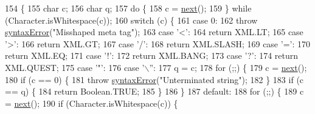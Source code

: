 \begin{DoxyCode}
154                                                   \{
155         \textcolor{keywordtype}{char} c;
156         \textcolor{keywordtype}{char} q;
157         \textcolor{keywordflow}{do} \{
158             c = \hyperlink{classorg_1_1json_1_1_j_s_o_n_tokener_ae129753dbe43ea50aa34e3c06773fdfb}{next}();
159         \} \textcolor{keywordflow}{while} (Character.isWhitespace(c));
160         \textcolor{keywordflow}{switch} (c) \{
161         \textcolor{keywordflow}{case} 0:
162             \textcolor{keywordflow}{throw} \hyperlink{classorg_1_1json_1_1_j_s_o_n_tokener_a467f559950c039f28394ce3a0d2659ca}{syntaxError}(\textcolor{stringliteral}{"Misshaped meta tag"});
163         \textcolor{keywordflow}{case} \textcolor{charliteral}{'<'}:
164             \textcolor{keywordflow}{return} XML.LT;
165         \textcolor{keywordflow}{case} \textcolor{charliteral}{'>'}:
166             \textcolor{keywordflow}{return} XML.GT;
167         \textcolor{keywordflow}{case} \textcolor{charliteral}{'/'}:
168             \textcolor{keywordflow}{return} XML.SLASH;
169         \textcolor{keywordflow}{case} \textcolor{charliteral}{'='}:
170             \textcolor{keywordflow}{return} XML.EQ;
171         \textcolor{keywordflow}{case} \textcolor{charliteral}{'!'}:
172             \textcolor{keywordflow}{return} XML.BANG;
173         \textcolor{keywordflow}{case} \textcolor{charliteral}{'?'}:
174             \textcolor{keywordflow}{return} XML.QUEST;
175         \textcolor{keywordflow}{case} \textcolor{charliteral}{'"'}:
176         \textcolor{keywordflow}{case} \textcolor{charliteral}{'\(\backslash\)''}:
177             q = c;
178             \textcolor{keywordflow}{for} (;;) \{
179                 c = \hyperlink{classorg_1_1json_1_1_j_s_o_n_tokener_ae129753dbe43ea50aa34e3c06773fdfb}{next}();
180                 \textcolor{keywordflow}{if} (c == 0) \{
181                     \textcolor{keywordflow}{throw} \hyperlink{classorg_1_1json_1_1_j_s_o_n_tokener_a467f559950c039f28394ce3a0d2659ca}{syntaxError}(\textcolor{stringliteral}{"Unterminated string"});
182                 \}
183                 \textcolor{keywordflow}{if} (c == q) \{
184                     \textcolor{keywordflow}{return} Boolean.TRUE;
185                 \}
186             \}
187         \textcolor{keywordflow}{default}:
188             \textcolor{keywordflow}{for} (;;) \{
189                 c = \hyperlink{classorg_1_1json_1_1_j_s_o_n_tokener_ae129753dbe43ea50aa34e3c06773fdfb}{next}();
190                 \textcolor{keywordflow}{if} (Character.isWhitespace(c)) \{

\end{DoxyCode}
